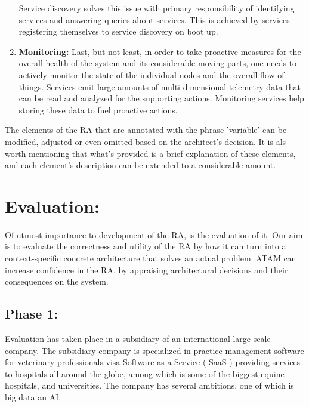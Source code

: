 \documentclass[runningheads]{llncs}
\begin{document}
\begin{enumerate}
     Service discovery solves this issue with primary responsibility of identifying services and answering queries about services. This is achieved by services registering themselves to service discovery on boot up.
    \item \textbf{Monitoring:} Last, but not least, in order to take proactive measures for the overall health of the system and its considerable moving parts, one needs to actively monitor the state of the individual nodes and the overall flow of things. Services emit large amounts of multi dimensional telemetry data that can be read and analyzed for the supporting actions. Monitoring services help storing these data to fuel proactive actions. 
\end{enumerate}

The elements of the RA that are annotated with the phrase 'variable' can be modified, adjusted or even omitted based on the architect's decision. It is als worth mentioning that what's provided is a brief explanation of these elements, and each element's description can be extended to a considerable amount. 


 

\section*{Evaluation:}

Of utmost importance to development of the RA, is the evaluation of it. Our aim is to evaluate the correctness and utility of the RA by how it can turn into a context-specific concrete architecture that solves an actual problem. ATAM can increase confidence in the RA, by appraising architectural decisions and their consequences on the system. 


\subsection{Phase 1:}
Evaluation has taken place in a subsidiary of an international large-scale company. The subsidiary company is specialized in practice management software for veterinary professionals visa Software as a Service ( SaaS ) providing services to hospitals all around the globe, among which is some of the biggest equine hospitals, and universities. The company has several ambitions, one of which is big data an AI. 
\end{document}
